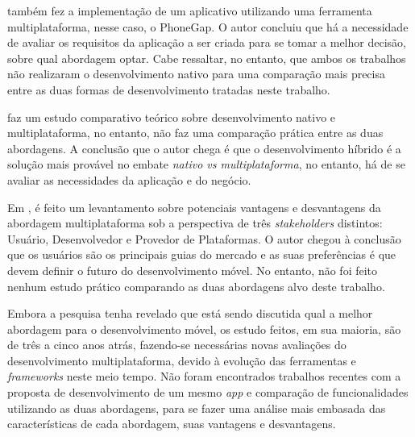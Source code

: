  também fez a implementação de um aplicativo utilizando uma ferramenta multiplataforma, nesse caso, o PhoneGap. 
O autor concluiu que há a necessidade de avaliar os requisitos da aplicação a ser criada para se tomar a melhor decisão, sobre qual abordagem optar.
Cabe ressaltar, no entanto, que ambos os trabalhos não realizaram o desenvolvimento nativo para uma comparação mais precisa entre as duas formas de desenvolvimento
tratadas neste trabalho. 

 faz um estudo comparativo teórico sobre desenvolvimento nativo e multiplataforma, no entanto,
não faz uma comparação prática entre as duas abordagens. A conclusão que o autor chega é que o desenvolvimento híbrido é a solução mais provável no embate 
\textit{nativo vs multiplataforma}, no entanto, há de se avaliar as necessidades da aplicação e do negócio.

Em , é feito um levantamento sobre potenciais vantagens e desvantagens da abordagem multiplataforma sob a 
perspectiva de três \textit{stakeholders} distintos: Usuário, Desenvolvedor e Provedor de Plataformas. O autor chegou à conclusão que os usuários são os principais
guias do mercado e as suas preferências é que devem definir o futuro do desenvolvimento móvel. No entanto, não foi feito nenhum estudo prático comparando
as duas abordagens alvo deste trabalho.

Embora a pesquisa tenha revelado que está sendo discutida qual a melhor abordagem para o desenvolvimento móvel, os estudo feitos, em sua maioria, são de três a cinco 
anos atrás, fazendo-se necessárias novas avaliações do desenvolvimento multiplataforma, devido à evolução das ferramentas e \textit{frameworks} neste meio tempo.
Não foram encontrados trabalhos recentes com a proposta de desenvolvimento de um mesmo \textit{app} e comparação de funcionalidades utilizando as duas abordagens, para se fazer uma análise mais embasada das
características de cada abordagem, suas vantagens e desvantagens.
 
\begin{comment}
Falar que tem mt trabalho comparativo de nativo e cross, mas não refletem a atualidades, pois mudou muito em poucos anos.
e nao ha um estudo comparativo
tenho 3 plataformas, o cross surgiu como uma solucao, e queremos confirmar se eh mesmo uma solucao
da pra confiar nessa abordagem pra todos os desenvolvimentos de apps?    
\end{comment}

